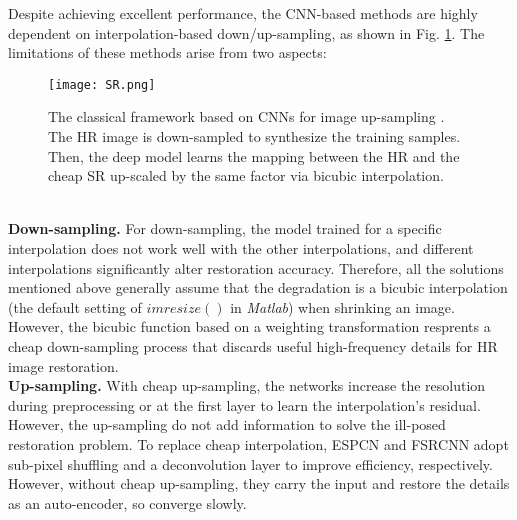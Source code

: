 \documentclass[runningheads]{llncs}
\begin{document}
Despite achieving excellent performance, the CNN-based methods are highly dependent on interpolation-based down/up-sampling, as shown in Fig. \ref{fig:sr}. The limitations of these methods arise from two aspects:\\
\begin{figure}[bth]
\begin{center}
   \texttt{[image: SR.png]}
\end{center}
   \caption{The classical framework based on CNNs for image up-sampling \cite{srcnn,vdsr,red,drcn,drrn}. The HR image is down-sampled to synthesize the training samples. Then, the deep model learns the mapping between the HR and the cheap SR up-scaled by the same factor via bicubic interpolation.}
\label{fig:sr}
\end{figure}\\
\textbf{Down-sampling.} For down-sampling, the model trained for a specific interpolation does not work well with the other interpolations, and different interpolations significantly alter restoration accuracy. Therefore, all the solutions mentioned above generally assume that the degradation is a bicubic interpolation (the default setting of $imresize()$ in \emph{Matlab}) when shrinking an image. However, the bicubic function based on a weighting transformation resprents a cheap down-sampling process that discards useful high-frequency details for HR image restoration.\\
\textbf{Up-sampling.} With cheap up-sampling, the networks \cite{vdsr,red,drcn,drrn} increase the resolution during preprocessing or at the first layer to learn the interpolation's residual. However, the up-sampling do not add information to solve the ill-posed restoration problem. To replace cheap interpolation, ESPCN \cite{espcn} and FSRCNN \cite{fsrcnn} adopt sub-pixel shuffling and a deconvolution layer to improve efficiency, respectively. However, without cheap up-sampling, they carry the input and restore the details as an auto-encoder, so converge slowly.
\end{document}
